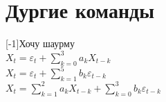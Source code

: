 \documentclass[12pt, a4paper]{article}
\begin{document}
\section{Дургие команды}
\newcommand{\crazy}[1]{\scalebox{-1}[-1]{#1}}
\crazy{Хочу шаурму} \\ %

\newcommand{\AR}[1]{\ensuremath {X_t=\varepsilon_t + \sum_{k=0}^{#1}a_k X_{t-k}}}  %
\AR{3} \\

\newcommand{\MA}[1]{\ensuremath {X_t=\varepsilon_t + \sum_{k=1}^{#1}b_k \varepsilon_{t-k}}} %
\MA{5} \\

\newcommand{\ARMA}[2]{\ensuremath {X_t=\sum_{k=1}^{#1}a_k X_{t-k} + \sum_{k=0}^{#2}b_k \varepsilon_{t-k}}} 
\ARMA{2}{3}
\end{document}
